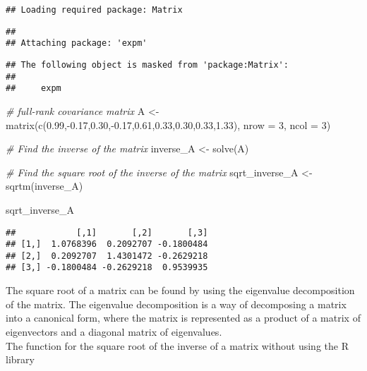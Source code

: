 \documentclass[
]{article}
\newenvironment{Shaded}{\begin{snugshade}}{\end{snugshade}}
\newcommand{\AttributeTok}[1]{\textcolor[rgb]{0.77,0.63,0.00}{#1}}
\newcommand{\CommentTok}[1]{\textcolor[rgb]{0.56,0.35,0.01}{\textit{#1}}}
\newcommand{\DecValTok}[1]{\textcolor[rgb]{0.00,0.00,0.81}{#1}}
\newcommand{\FloatTok}[1]{\textcolor[rgb]{0.00,0.00,0.81}{#1}}
\newcommand{\FunctionTok}[1]{\textcolor[rgb]{0.00,0.00,0.00}{#1}}
\newcommand{\NormalTok}[1]{#1}
\newcommand{\OtherTok}[1]{\textcolor[rgb]{0.56,0.35,0.01}{#1}}
\newcommand{\SpecialCharTok}[1]{\textcolor[rgb]{0.00,0.00,0.00}{#1}}
\begin{document}
\begin{verbatim}
## Loading required package: Matrix
\end{verbatim}

\begin{verbatim}
## 
## Attaching package: 'expm'
\end{verbatim}

\begin{verbatim}
## The following object is masked from 'package:Matrix':
## 
##     expm
\end{verbatim}

\begin{Shaded}
\begin{Highlighting}[]
\CommentTok{\# full{-}rank covariance matrix}
\NormalTok{A }\OtherTok{\textless{}{-}} \FunctionTok{matrix}\NormalTok{(}\FunctionTok{c}\NormalTok{(}\FloatTok{0.99}\NormalTok{,}\SpecialCharTok{{-}}\FloatTok{0.17}\NormalTok{,}\FloatTok{0.30}\NormalTok{,}\SpecialCharTok{{-}}\FloatTok{0.17}\NormalTok{,}\FloatTok{0.61}\NormalTok{,}\FloatTok{0.33}\NormalTok{,}\FloatTok{0.30}\NormalTok{,}\FloatTok{0.33}\NormalTok{,}\FloatTok{1.33}\NormalTok{), }\AttributeTok{nrow =} \DecValTok{3}\NormalTok{, }\AttributeTok{ncol =} \DecValTok{3}\NormalTok{)}

\CommentTok{\# Find the inverse of the matrix}
\NormalTok{inverse\_A }\OtherTok{\textless{}{-}} \FunctionTok{solve}\NormalTok{(A)}

\CommentTok{\# Find the square root of the inverse of the matrix}
\NormalTok{sqrt\_inverse\_A }\OtherTok{\textless{}{-}} \FunctionTok{sqrtm}\NormalTok{(inverse\_A)}

\NormalTok{sqrt\_inverse\_A}
\end{Highlighting}
\end{Shaded}

\begin{verbatim}
##            [,1]       [,2]       [,3]
## [1,]  1.0768396  0.2092707 -0.1800484
## [2,]  0.2092707  1.4301472 -0.2629218
## [3,] -0.1800484 -0.2629218  0.9539935
\end{verbatim}

The square root of a matrix can be found by using the eigenvalue
decomposition of the matrix. The eigenvalue decomposition is a way of
decomposing a matrix into a canonical form, where the matrix is
represented as a product of a matrix of eigenvectors and a diagonal
matrix of eigenvalues.\\

The function for the square root of the inverse of a matrix without
using the R library\\
\end{document}
